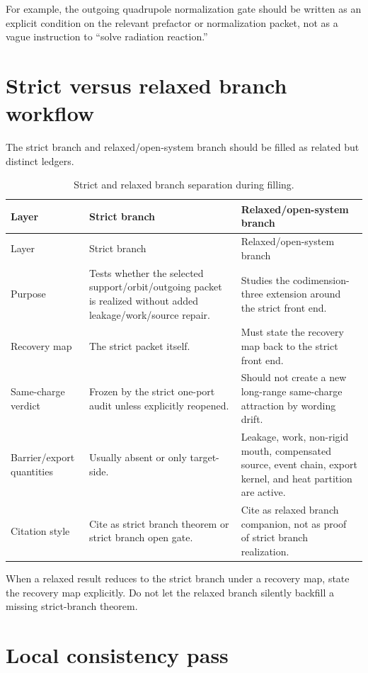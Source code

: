 For example, the outgoing quadrupole normalization gate should be written as an explicit condition on the relevant prefactor or normalization packet, not as a vague instruction to ``solve radiation reaction.''

\section{Strict versus relaxed branch workflow}
\label{sec:strict-versus-relaxed-workflow}

The strict branch and relaxed/open-system branch should be filled as related but distinct ledgers.

\begin{longtable}{@{}L{0.23\textwidth}L{0.35\textwidth}L{0.32\textwidth}@{}}
\caption{Strict and relaxed branch separation during filling.}\label{tab:strict-relaxed-fill-separation}\\
\toprule
Layer & Strict branch & Relaxed/open-system branch \\
\midrule
\endfirsthead
\toprule
Layer & Strict branch & Relaxed/open-system branch \\
\midrule
\endhead
Purpose & Tests whether the selected support/orbit/outgoing packet is realized without added leakage/work/source repair. & Studies the codimension-three extension around the strict front end. \\
\addlinespace
Recovery map & The strict packet itself. & Must state the recovery map back to the strict front end. \\
\addlinespace
Same-charge verdict & Frozen by the strict one-port audit unless explicitly reopened. & Should not create a new long-range same-charge attraction by wording drift. \\
\addlinespace
Barrier/export quantities & Usually absent or only target-side. & Leakage, work, non-rigid mouth, compensated source, event chain, export kernel, and heat partition are active. \\
\addlinespace
Citation style & Cite as strict branch theorem or strict branch open gate. & Cite as relaxed branch companion, not as proof of strict branch realization. \\
\bottomrule
\end{longtable}

When a relaxed result reduces to the strict branch under a recovery map, state the recovery map explicitly.  Do not let the relaxed branch silently backfill a missing strict-branch theorem.

\section{Local consistency pass}
\label{sec:local-consistency-pass}

